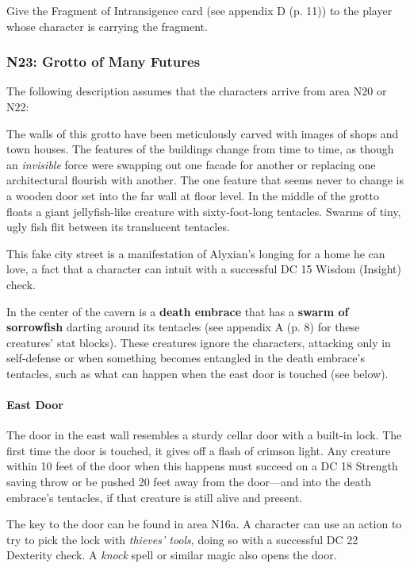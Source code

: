 \documentclass[a4paper, 11pt, bg=full, twocolumn, nooutline]{dndbook}
\begin{document}
Give the Fragment of Intransigence card (see appendix D (p. 11)) to the player whose character is carrying the fragment.

\subsubsection{N23: Grotto of Many Futures}

The following description assumes that the characters arrive from area N20 or N22:

\begin{DndReadAloud}
The walls of this grotto have been meticulously carved with images of shops and town houses. The features of the buildings change from time to time, as though an \textit{invisible} force were swapping out one facade for another or replacing one architectural flourish with another. The one feature that seems never to change is a wooden door set into the far wall at floor level.
In the middle of the grotto floats a giant jellyfish-like creature with sixty-foot-long tentacles. Swarms of tiny, ugly fish flit between its translucent tentacles.
\end{DndReadAloud}


This fake city street is a manifestation of Alyxian's longing for a home he can love, a fact that a character can intuit with a successful DC 15 Wisdom (Insight) check.

In the center of the cavern is a \textbf{death embrace} that has a \textbf{swarm of sorrowfish} darting around its tentacles (see appendix A (p. 8) for these creatures' stat blocks). These creatures ignore the characters, attacking only in self-defense or when something becomes entangled in the death embrace's tentacles, such as what can happen when the east door is touched (see below).

\paragraph{East Door}

The door in the east wall resembles a sturdy cellar door with a built-in lock. The first time the door is touched, it gives off a flash of crimson light. Any creature within 10 feet of the door when this happens must succeed on a DC 18 Strength saving throw or be pushed 20 feet away from the door---and into the death embrace's tentacles, if that creature is still alive and present.

The key to the door can be found in area N16a. A character can use an action to try to pick the lock with \textit{thieves' tools}, doing so with a successful DC 22 Dexterity check. A \textit{knock} spell or similar magic also opens the door.
\end{document}
